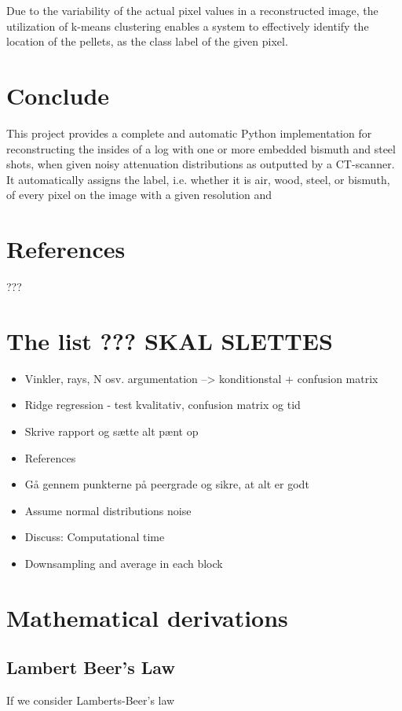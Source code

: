 \documentclass{article}
\begin{document}
Due to the variability of the actual pixel values in a reconstructed image, the utilization of k-means clustering enables a system to effectively identify the location of the pellets, as the class label of the given pixel.


\section{Conclude}
This project provides a complete and automatic Python implementation for reconstructing the insides of a log with one or more embedded bismuth and steel shots, when given noisy attenuation distributions as outputted by a CT-scanner. It automatically assigns the label, i.e. whether it is air, wood, steel, or bismuth, of every pixel on the image with a given resolution and 


\section{References}
???


\section{The list ??? SKAL SLETTES}
\begin{itemize}
    \item Vinkler, rays, N osv. argumentation --> konditionstal + confusion matrix
    \item Ridge regression - test kvalitativ, confusion matrix og tid
    \item Skrive rapport og sætte alt pænt op
    \item References
    \item Gå gennem punkterne på peergrade og sikre, at alt er godt
    \item Assume normal distributions noise
    \item Discuss: Computational time 
    \item Downsampling and average in each block
\end{itemize}





\newpage
\appendix
\section{Mathematical derivations}
\subsection{Lambert Beer's Law}\label{appendix:lambert-beers-law}
If we consider Lamberts-Beer's law
\end{document}
